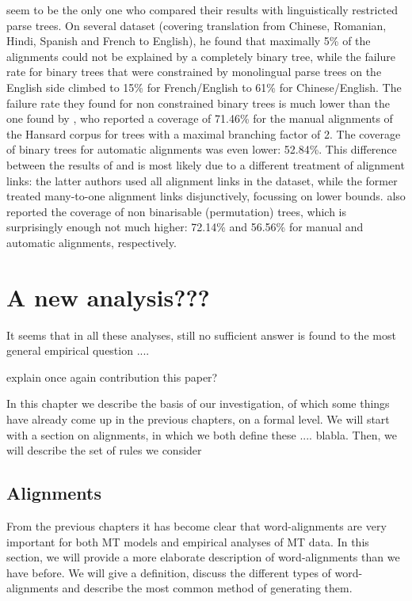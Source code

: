\documentclass{report}
\theoremstyle{definition}
\theoremstyle{plain}
\begin{document}
\cite{wellington2006empirical} seem to be the only one who compared their results with linguistically restricted parse trees. On several dataset (covering translation from Chinese, Romanian, Hindi, Spanish and French to English), he found that maximally 5\% of the alignments could not be explained by a completely binary tree, while the failure rate for binary trees that were constrained by monolingual parse trees on the English side climbed to 15\% for French/English to 61\% for Chinese/English. The failure rate they found for non constrained binary trees is much lower than the one found by \cite{simaan2013hats}, who reported a coverage of 71.46\% for the manual alignments of the Hansard corpus for trees with a maximal branching factor of 2. The coverage of binary trees for automatic alignments was even lower: 52.84\%. This difference between the results of \cite{wellington2006empirical} and \cite{simaan2013hats} is most likely due to a different treatment of alignment links: the latter authors used all alignment links in the dataset, while the former treated many-to-one alignment links disjunctively, focussing on lower bounds. \cite{simaan2013hats} also reported the coverage of non binarisable (permutation) trees, which is surprisingly enough not much higher: 72.14\% and 56.56\% for manual and automatic alignments, respectively.


\chapter{A new analysis???}

It seems that in all these analyses, still no sufficient answer is found to the most general empirical question ....

explain once again contribution this paper?


In this chapter we describe the basis of our investigation, of which some things have already come up in the previous chapters, on a formal level. We will start with a section on alignments, in which we both define these .... blabla. Then, we will describe the set of rules we consider



\section{Alignments}
\label{sec:alignments}

From the previous chapters it has become clear that word-alignments are very important for both MT models and empirical analyses of MT data. In this section, we will provide a more elaborate description of word-alignments than we have before. We will give a definition, discuss the different types of word-alignments and describe the most common method of generating them.
\end{document}
